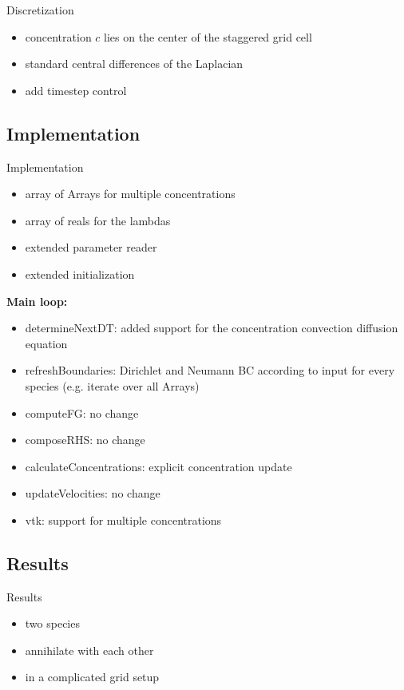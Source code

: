 \documentclass[t,mathserif]{beamer}
\begin{document}
\begin{frame}[allowframebreaks]{Discretization}
\begin{itemize}
	\item concentration $c$ lies on the center of the staggered grid cell
	\item standard central differences of the Laplacian
	\item add timestep control
\end{itemize}
\end{frame}

\subsection{Implementation}
\begin{frame}[allowframebreaks]{Implementation}
\begin{itemize}
	\item array of Arrays for multiple concentrations
	\item array of reals for the lambdas
	\item extended parameter reader
	\item extended initialization
\end{itemize}
\framebreak
\textbf{Main loop:}
\begin{itemize}
	\item determineNextDT: added support for the concentration convection diffusion equation
    \item refreshBoundaries: Dirichlet and Neumann BC according to input for every species (e.g. iterate over all Arrays)
    \item computeFG: no change
    \item composeRHS: no change
    \item calculateConcentrations: explicit concentration update
    \item updateVelocities: no change
    \item vtk: support for multiple concentrations
\end{itemize}
\end{frame}

\subsection{Results}
\begin{frame}[allowpagebreaks]{Results}
\begin{itemize}
	\item two species
	\item annihilate with each other
	\item in a complicated grid setup
\end{itemize}
\end{frame}
\end{document}
